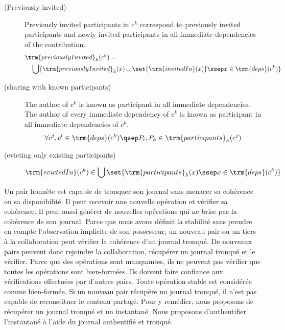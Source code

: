 \begin{definition}
\begin{description}
    \item[ (Previously invited)]
    Previously invited participants in $c^k$ correspond to previously invited participants and newly invited participants in all immediate dependencies of the contribution.
    \begin{align*}
    &\trm{previouslyInvited}_h(c^k) =\\
    &\quad\bigcup \{\trm{previouslyInvited}_h(x) \cup \set{\trm{invitedIn}(x)} \ssep x \in \trm{deps}(c^k)\}
    \end{align*}

    \item[ (sharing with known participants)]
    The author of $c^k$ is known as participant in all immediate dependencies. The author of every immediate dependency of $c^k$ is known as participant in all immediate dependencies of $c^k$.
    \begin{equation*}
    \forall c^j, c^l \in \trm{deps}(c^k) \qsep P_l, P_k \in \trm{participants}_h(c^j)
    \end{equation*}

    \item[ (evicting only existing participants)]
    \begin{equation*}
    \trm{evictedIn}(c^k) \in \bigcup \set{\trm{participants}_h(x) \ssep x \in \trm{deps}(c^k)}
    \end{equation*}
  \end{description}
\end{definition}

Un pair honnête est capable de tronquer son journal sans menacer sa cohérence ou sa disponibilité.
Il peut recevoir une nouvelle opération et vérifier sa cohérence.
Il peut aussi génèrer de nouvelles opérations qui ne brise pas la cohérence de son journal.
Parce que nous avons définit la stabilité sans prendre en compte l'observation implicite de son possesseur, un nouveau pair ou un tiers à la collaboration peut vérifier la cohérence d'un journal tronqué.
De nouveaux pairs peuvent donc rejoindre la collaboration, récupérer un journal tronqué et le vérifier.
Parce que des opérations sont manquantes, ils ne peuvent pas vérifier que toutes les opérations sont bien-formées.
Ils doivent faire confiance aux vérifications effectuées par d'autres pairs.
Toute opération stable est considérée comme bien-formée.
Si un nouveau pair récupère un journal tronqué, il n'est pas capable de reconstituer le contenu partagé.
Pour y remédier, nous proposons de récupérer un journal tronqué et un instantané.
Nous proposons d'authentifier l'instantané à l'aide du journal authentifié et tronqué.

